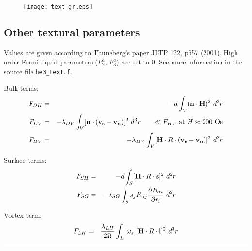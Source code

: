\documentclass[a4paper]{article}
\begin{document}
\begin{figure}[h]
\texttt{[image: text\_gr.eps]}\\
\end{figure}

\eject
\subsection*{Other textural parameters}

Values are given according to Thuneberg's paper JLTP 122, p657 (2001).
High order Fermi liquid parameters ($F_2^a$, $F_3^a$) are set to 0.
See more information in the source file {\tt he3\_text.f}.

Bulk terms:
\begin{eqnarray*}
F_{DH} &=& -a
  \int_V ({\bf n} \cdot {\bf H})^2\ d^3r\\
F_{DV} &=& -\lambda_{DV}
  \int_V [{\bf n} \cdot ({\bf v_s}-{\bf v_n}) ]^2\ d^3r
\qquad {\ll F_{HV} \mbox{~at~} H\approx 200 \mbox{~Oe}}\\
F_{HV} &=& -\lambda_{HV}
  \int_V [{\bf H} \cdot R \cdot ({\bf v_s}-{\bf v_n}) ]^2\ d^3r\\
\end{eqnarray*}

Surface terms:
\begin{eqnarray*}
F_{SH} &=& -d
  \int_S [{\bf H} \cdot R \cdot {\bf s} ]^2\ d^2r\\
F_{SG} &=& -\lambda_{SG}
  \int_S s_j R_{\alpha j}
    \frac{\partial R_{\alpha i}}{\partial r_i}\ d^2r\\
\end{eqnarray*}

Vortex term:
\begin{eqnarray*}
F_{LH} &=& \frac{\lambda_{LH}}{2\Omega}
  \int_L |\omega_s| [{\bf H} \cdot R \cdot {\bf l} ]^2\ d^3r\\
\end{eqnarray*}

\hrule
\end{document}
